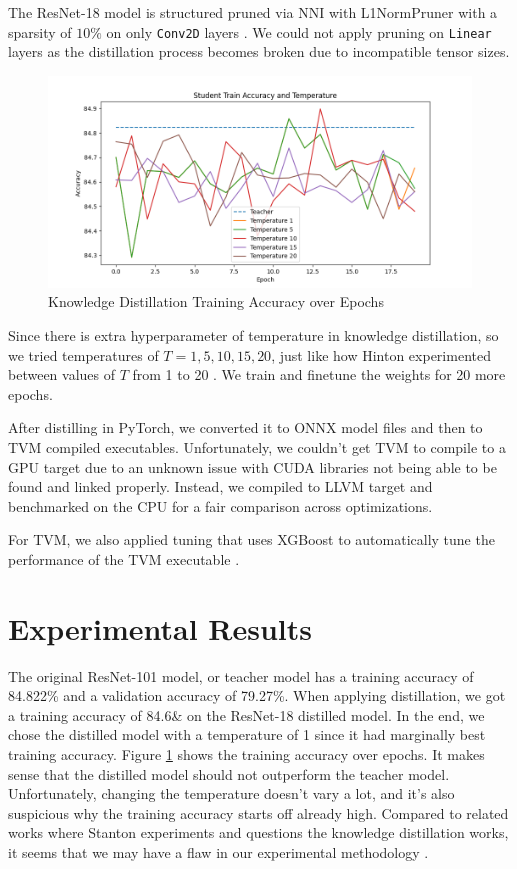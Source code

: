 \documentclass{article}
\begin{document}
The ResNet-18 model is structured pruned via NNI with L1NormPruner with a sparsity of $10\%$ on only \verb|Conv2D| layers \cite{l1prune}. We could not apply pruning on \verb|Linear| layers as the distillation process becomes broken due to incompatible tensor sizes.

\begin{figure}
	\centerline{\includegraphics[width=7in]{../proj4/figures/kd_training.png}}
	\caption{Knowledge Distillation Training Accuracy over Epochs}
	\label{fig:kd-training}
\end{figure}

Since there is extra hyperparameter of temperature in knowledge distillation, so we tried temperatures of $T = 1, 5, 10, 15, 20$, just like how Hinton experimented between values of $T$ from 1 to 20 \cite{distillation}. We train and finetune the weights for 20 more epochs.

After distilling in PyTorch, we converted it to ONNX model files and then to TVM compiled executables. Unfortunately, we couldn't get TVM to compile to a GPU target due to an unknown issue with CUDA libraries not being able to be found and linked properly. Instead, we compiled to LLVM target and benchmarked on the CPU for a fair comparison across optimizations.

For TVM, we also applied tuning that uses XGBoost to automatically tune the performance of the TVM executable \cite{xgboost}.

\section{Experimental Results}
The original ResNet-101 model, or teacher model has a training accuracy of 84.822\% and a validation accuracy of 79.27\%. When applying distillation, we got a training accuracy of 84.6\& on the ResNet-18 distilled model. In the end, we chose the distilled model with a temperature of 1 since it had marginally best training accuracy. Figure \ref{fig:kd-training} shows the training accuracy over epochs. It makes sense that the distilled model should not outperform the teacher model. Unfortunately, changing the temperature doesn't vary a lot, and it's also suspicious why the training accuracy starts off already high. Compared to related works where Stanton experiments and questions the knowledge distillation works, it seems that we may have a flaw in our experimental methodology \cite{distillation-works}.
\end{document}
